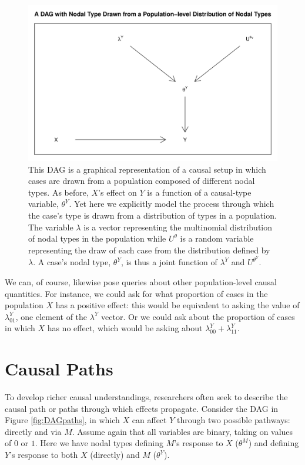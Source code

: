 \documentclass[
  12pt,
]{book}
\begin{document}
\begin{figure}

{\centering \includegraphics[width=0.6\linewidth]{ii_files/figure-latex/DAGace-1} 

}

\caption{This DAG is a graphical representation of a causal setup in which cases are drawn from a population composed of different nodal types. As before, $X$'s effect on $Y$ is a function of a causal-type variable, $\theta^Y$. Yet here we explicitly model the process through which the case's type is drawn from a distribution of types in a population. The variable $\lambda$ is a vector representing the multinomial distribution of nodal types in the population while $U^\theta$ is a random variable representing the draw of each case from the distribution defined by $\lambda$. A case's nodal type, $\theta^Y$, is thus a joint function of $\lambda^Y$ and $U^{\theta^Y}$.}\label{fig:DAGace}
\end{figure}

We can, of course, likewise pose queries about other population-level causal quantities. For instance, we could ask for what proportion of cases in the population \(X\) has a positive effect: this would be equivalent to asking the value of \(\lambda^Y_{01}\), one element of the \(\lambda^Y\) vector. Or we could ask about the proportion of cases in which \(X\) has no effect, which would be asking about \(\lambda^Y_{00} + \lambda^Y_{11}\).

\hypertarget{causal-paths}{%
\section{Causal Paths}\label{causal-paths}}

To develop richer causal understandings, researchers often seek to describe the causal path or paths through which effects propagate. Consider the DAG in Figure \ref{fig:DAGpaths}, in which \(X\) can affect \(Y\) through two possible pathways: directly and via \(M\). Assume again that all variables are binary, taking on values of \(0\) or \(1\). Here we have nodal types defining \(M\)'s response to \(X\) (\(\theta^M\)) and defining \(Y\)'s response to both \(X\) (directly) and \(M\) (\(\theta^Y\)).
\end{document}
